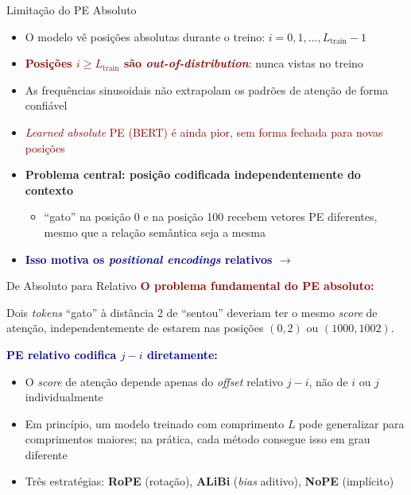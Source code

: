 \documentclass[aspectratio=169, xcolor=dvipsnames]{beamer}
\begin{document}
  \begin{frame}{Limitação do PE Absoluto}
    \begin{itemize}
      \item O modelo vê posições absolutas durante o treino: $i = 0, 1, \ldots, L_{\text{train}}{-}1$
      \item \textcolor{DarkRed}{\textbf{Posições $i \ge L_{\text{train}}$ são \textit{out-of-distribution}}}: nunca vistas no treino
      \item As frequências sinusoidais não extrapolam os padrões de atenção de forma confiável
      \item \textcolor{DarkRed}{\textit{Learned absolute} PE (BERT) é ainda pior, sem forma fechada para novas posições}
      \item \textbf{Problema central: posição codificada independentemente do contexto}
        \begin{itemize}
          \item ``gato'' na posição 0 e na posição 100 recebem vetores PE diferentes, mesmo que a relação semântica seja a mesma
        \end{itemize}
      \item \textcolor{DarkBlue}{\textbf{Isso motiva os \textit{positional encodings} relativos $\to$}}
    \end{itemize}
  \end{frame}

  \begin{frame}{De Absoluto para Relativo}
    \textcolor{DarkRed}{\textbf{O problema fundamental do PE absoluto:}}

    \begin{alertblock}{}
      Dois \textit{tokens} ``gato'' à distância 2 de ``sentou'' deveriam ter o mesmo \textit{score} de atenção,
      independentemente de estarem nas posições $(0, 2)$ ou $(1000, 1002)$.
    \end{alertblock}

    \textcolor{DarkBlue}{\textbf{PE relativo codifica $j - i$ diretamente:}}

    \begin{itemize}
      \item O \textit{score} de atenção depende apenas do \textit{offset} relativo $j - i$, não de $i$ ou $j$ individualmente
      \item Em princípio, um modelo treinado com comprimento $L$ pode generalizar para comprimentos maiores; na prática, cada método consegue isso em grau diferente
      \item Três estratégias: \textbf{RoPE} (rotação), \textbf{ALiBi} (\textit{bias} aditivo), \textbf{NoPE} (implícito)
    \end{itemize}
  \end{frame}
\end{document}
